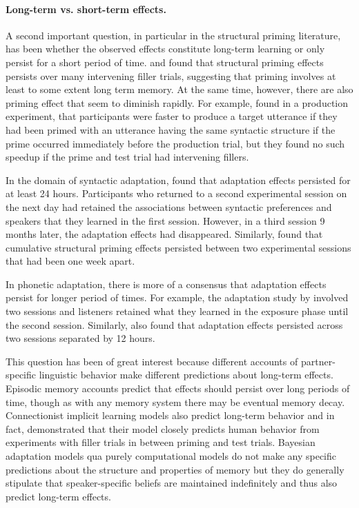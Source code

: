 \paragraph{Long-term vs. short-term effects.} A second important question, in particular in the structural priming literature, has been whether 
the observed effects constitute long-term learning or only persist for a short period of time. \textcite{Bock2000} and \textcite{Bock2007} found
that structural priming effects persists over many intervening filler trials, suggesting that priming involves at least to some extent long term
memory. At the same time, however, there are also priming effect that seem to diminish rapidly. For example, \textcite{Wheeldon2003} found
in a production experiment, that participants were faster to produce a target utterance if they had been primed with an utterance having the same
syntactic structure if the prime occurred immediately before the production trial, but they found no such speedup if the prime and test trial
had intervening fillers.

In the domain of syntactic adaptation, \textcite{Kroczek2017} found that adaptation effects persisted for at least 24 hours. Participants
who returned to a second experimental session on the next day had retained the associations between syntactic preferences and speakers
that they learned in the first session. However, in a third session 9 months later, the adaptation effects had disappeared. Similarly, \textcite{Kaschak2011}
found that cumulative structural priming effects persisted between two experimental sessions that had been one week apart.

In phonetic adaptation, there is more of a consensus that adaptation effects persist for longer period of times. For example, the adaptation study by \textcite{Bradlow2008}
involved two sessions and listeners retained what they learned in the exposure phase until the second session. Similarly, \cite{Xie2018} also found 
that adaptation effects persisted across two sessions separated by 12 hours.

This question has been of great interest because different accounts of partner-specific linguistic behavior make different predictions about long-term effects.
Episodic memory accounts predict that effects should persist over long periods of time, though as with any memory system there may be eventual memory decay. Connectionist
implicit learning models also predict long-term behavior and in fact, \textcite{Chang2006} demonstrated that their model closely predicts human behavior from experiments with filler trials
in between priming and test trials. Bayesian adaptation models qua purely computational models \cite{Marr1982} do not make any specific predictions about the structure and properties of memory
 but they do generally stipulate that speaker-specific beliefs are maintained indefinitely and thus also predict long-term effects.  
 
